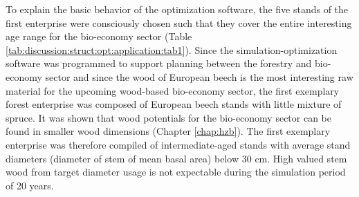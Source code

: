To explain the basic behavior of the optimization software, the five stands of the first enterprise were consciously chosen such that they cover the entire interesting age range for the bio-economy sector (Table \ref{tab:discussion:struct:opt:application:tab1}). Since the simulation-optimization software was programmed to support planning between the forestry and bio-economy sector and since the wood of European beech is the most interesting raw material for the upcoming wood-based bio-economy sector, the first exemplary forest enterprise was composed of European beech stands with little mixture of spruce. It was shown that wood potentials for the bio-economy sector can be found in smaller wood dimensions (Chapter \ref{chap:hzb}). The first exemplary enterprise was therefore compiled of intermediate-aged stands with average stand diameters (diameter of stem of mean basal area) below 30 cm. High valued stem wood from target diameter usage is not expectable during the simulation period of 20 years.

